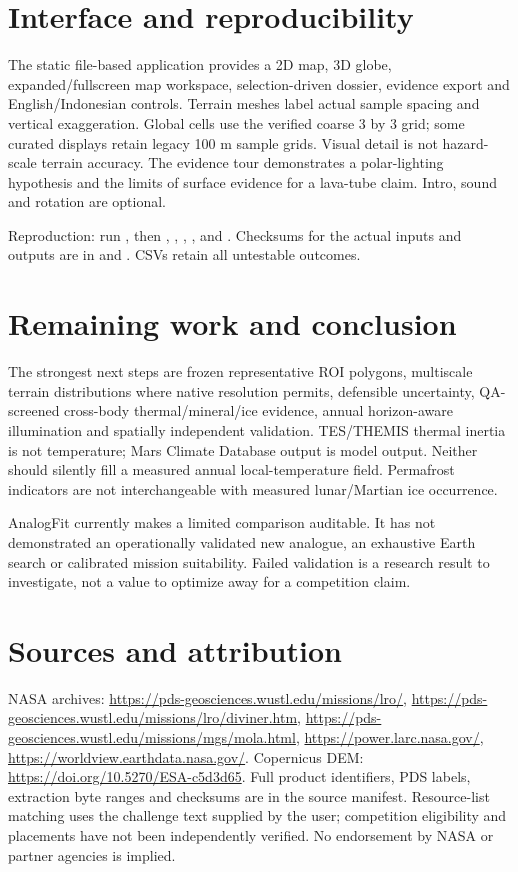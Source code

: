 \documentclass[10pt,a4paper]{article}
\begin{document}
\section{Interface and reproducibility}
The static file-based application provides a 2D map, 3D globe, expanded/fullscreen
map workspace, selection-driven dossier, evidence export and English/Indonesian
controls. Terrain meshes label actual sample spacing and vertical exaggeration.
Global cells use the verified coarse 3 by 3 grid; some curated displays retain
legacy 100 m sample grids. Visual detail is not hazard-scale terrain accuracy.
The evidence tour demonstrates a polar-lighting hypothesis and the limits of
surface evidence for a lava-tube claim. Intro, sound and rotation are optional.

Reproduction: run , then
, ,
, , 
and . Checksums for the actual inputs and outputs
are in  and
. CSVs retain all untestable outcomes.

\section{Remaining work and conclusion}
The strongest next steps are frozen representative ROI polygons, multiscale
terrain distributions where native resolution permits, defensible uncertainty,
QA-screened cross-body thermal/mineral/ice evidence, annual horizon-aware
illumination and spatially independent validation. TES/THEMIS thermal inertia is
not temperature; Mars Climate Database output is model output. Neither should
silently fill a measured annual local-temperature field. Permafrost indicators
are not interchangeable with measured lunar/Martian ice occurrence.

AnalogFit currently makes a limited comparison auditable. It has not demonstrated
an operationally validated new analogue, an exhaustive Earth search or calibrated
mission suitability. Failed validation is a research result to investigate, not
a value to optimize away for a competition claim.

\section*{Sources and attribution}
NASA archives: \url{https://pds-geosciences.wustl.edu/missions/lro/},
\url{https://pds-geosciences.wustl.edu/missions/lro/diviner.htm},
\url{https://pds-geosciences.wustl.edu/missions/mgs/mola.html},
\url{https://power.larc.nasa.gov/}, \url{https://worldview.earthdata.nasa.gov/}.
Copernicus DEM: \url{https://doi.org/10.5270/ESA-c5d3d65}.
Full product identifiers, PDS labels, extraction byte ranges and checksums are
in the source manifest. Resource-list matching uses the challenge text supplied
by the user; competition eligibility and placements have not been independently
verified. No endorsement by NASA or partner agencies is implied.
\end{document}
